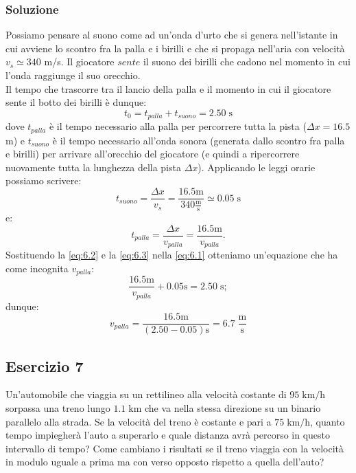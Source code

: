 \documentclass[12pt,a4paper]{book}
\begin{document}
\subsubsection*{Soluzione}
Possiamo pensare al suono come ad un'onda d'urto che si genera nell'istante in cui avviene lo scontro fra la palla e i birilli e che si propaga nell'aria con velocità $v_{s}\simeq340$ m/s. Il giocatore $sente$ il suono dei birilli che cadono nel momento in cui l'onda raggiunge il suo orecchio.\\
Il tempo che trascorre tra il lancio della palla e il momento in cui il giocatore sente il botto dei birilli è dunque:
\begin{equation}
t_{0}=t_{palla}+t_{suono}=2.50 \; \text{s}
\label{eq:6.1}
\end{equation}
dove $t_{palla}$ è il tempo necessario alla palla per percorrere tutta la pista ($\Delta x=16.5$ m) e $t_{suono}$ è il tempo necessario all'onda sonora (generata dallo scontro fra palla e birilli) per arrivare all'orecchio del giocatore (e quindi a ripercorrere nuovamente tutta la lunghezza della pista $\Delta x$). Applicando le leggi orarie possiamo scrivere:
\begin{equation}
t_{suono}=\frac{\Delta x}{v_s}=\frac{16.5 \text{m}}{340 \frac{\text{m}}{\text{s}}}\simeq 0.05 \; \text{s}
\label{eq:6.2}
\end{equation}
e:
\begin{equation}
t_{palla}=\frac{\Delta x}{v_{palla}}=\frac{16.5 \text{m}}{v_{palla}}.
\label{eq:6.3}
\end{equation}
Sostituendo la \ref{eq:6.2} e la \ref{eq:6.3} nella \ref{eq:6.1} otteniamo un'equazione che ha come incognita $v_{palla}$:
\begin{equation*}
\frac{16.5 \text{m}}{v_{palla}}+0.05 \text{s}=2.50 \; \text{s};
\end{equation*}
dunque:
\begin{equation*}
v_{palla}=\frac{16.5 \text{m}}{(2.50-0.05) \text{s}}=6.7 \; \frac{\text{m}}{\text{s}}
\end{equation*}

\subsection*{Esercizio 7} 
Un'automobile che viaggia su un rettilineo alla velocità costante di $95\;\text{km/h}$ sorpassa una treno lungo $1.1\;\text{km}$ che va nella stessa direzione su un binario parallelo alla strada. Se la velocità del treno è costante e pari a $75\;\text{km/h}$, quanto tempo impiegherà l'auto a superarlo e quale distanza avrà percorso in questo intervallo di tempo? Come cambiano i risultati se il treno viaggia con la velocità in modulo uguale a prima ma con verso opposto rispetto a quella dell'auto?
\end{document}
